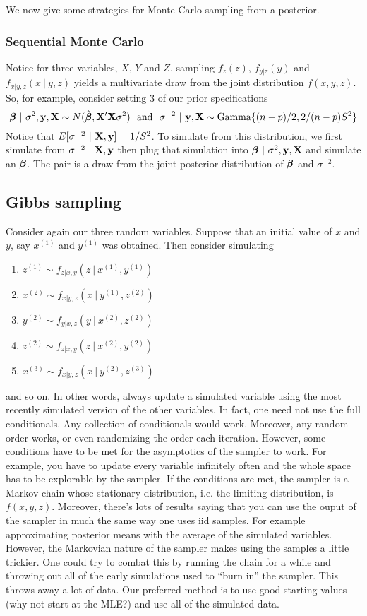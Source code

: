 We now give some strategies for Monte Carlo sampling from a posterior.

\subsubsection{Sequential Monte Carlo}

Notice for three variables, $X$, $Y$ and $Z$, sampling $f_z(z)$, $f_{y|z}(y)$ and $f_{x|y,z}(x ~|~ y, z)$ yields a multivariate draw from the joint distribution $f(x, y, z)$. So, for example, consider
setting 3 of our prior specifications
$$
\boldsymbol{\beta} ~|~ \sigma^2, \mathbf{y}, \mathbf{X} \sim 
N(\hat {\boldsymbol{\beta}}, \mathbf{X}' \mathbf{X} \sigma^2) ~~\mbox{and}~~
\sigma^{-2} ~|~ \mathbf{y}, \mathbf{X} \sim \mbox{Gamma}\{(n - p) / 2, 2 / (n - p) S^2\}
$$
Notice that $E[\sigma^{-2} ~|~ \mathbf{X}, \mathbf{y}] = 1 / S^2$. To simulate from this distribution,
we first simulate from $\sigma^{-2} ~|~ \mathbf{X}, \mathbf{y}$ 
then plug that simulation into $\boldsymbol{\beta} ~|~ \sigma^2, \mathbf{y}, \mathbf{X}$
and simulate an $\boldsymbol{\beta}$. The pair is a draw from the joint posterior 
distribution of $\boldsymbol{\beta}$ and $\sigma^{-2}$.

\subsection{Gibbs sampling}

Consider again our three random variables. Suppose that an initial value of $x$ and $y$, say $x^{(1)}$ and $y^{(1)}$ was obtained. Then consider simulating 
\begin{enumerate}
\item $z^{(1)} \sim f_{z|x,y}(z ~|~ x^{(1)}, y^{(1)})$
\item $x^{(2)} \sim f_{x|y,z}(x ~|~ y^{(1)},z^{(2)})$
\item $y^{(2)} \sim f_{y|x,z}(y ~|~ x^{(2)}, z^{(2)})$
\item $z^{(2)} \sim f_{z|x,y}(z ~|~ x^{(2)}, y^{(2)})$
\item $x^{(3)} \sim f_{x|y,z}(x ~|~ y^{(2)}, z^{(3)})$
\end{enumerate}
and so on. In other words, always update a simulated variable using the most recently simulated
version of the other variables. In fact, one need not use the full conditionals. Any collection
of conditionals would work. Moreover, any random order works, or even randomizing the order
each iteration. However, some conditions have to be met for the asymptotics of the 
sampler to work. For example, you have to update every variable infinitely often and the
whole space has to be explorable by the sampler. If the conditions are met, the sampler
is a Markov chain whose stationary distribution, i.e. the limiting distribution, is 
$f(x, y, z)$. Moreover, there's lots of results saying that you can use the ouput of the
sampler in much the same way one uses iid samples. For example approximating posterior
means with the average of the simulated variables. However, the Markovian nature of the sampler
makes using the samples a little trickier. One could try to combat this by running the chain for a while and throwing out all of the early simulations used to ``burn in'' the sampler. This throws away
a lot of data. Our preferred method is to use good starting values (why not start at the MLE?)
and use all of the simulated data. 

